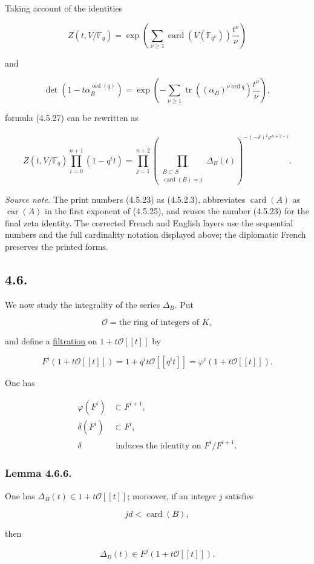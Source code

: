 Taking account of the identities

\begin{equation}\tag{4.5.31}
Z(t,V/\mathbb F_q)
=\exp\!\left(
\sum_{\nu\geq1}
\operatorname{card}(V(\mathbb F_{q^\nu}))\frac{t^\nu}{\nu}
\right)
\end{equation}

and

\begin{equation}\tag{4.5.32}
\det\!\left(1-t\alpha_B^{\operatorname{ord}(q)}\right)
=\exp\!\left(
-\sum_{\nu\geq1}
\operatorname{tr}\!\left((\alpha_B)^{\nu\operatorname{ord}q}\right)
\frac{t^\nu}{\nu}
\right),
\end{equation}

formula (4.5.27) can be rewritten as

\begin{equation}\tag{4.5.33}
Z(t,V/\mathbb F_q)\prod_{i=0}^{n+1}(1-q^it)
=\prod_{j=1}^{n+2}
\left(
\prod_{\substack{B\subset S\\\operatorname{card}(B)=j}}
\Delta_B(t)
\right)^{-(-\delta)^j\varphi^{n+2-j}}.
\end{equation}

\medskip
\noindent\emph{Source note.}
The print numbers (4.5.23) as (4.5.2.3), abbreviates
$\operatorname{card}(A)$ as $\operatorname{car}(A)$ in the first exponent
of (4.5.25), and reuses the number (4.5.23) for the final zeta identity.
The corrected French and English layers use the sequential numbers and the
full cardinality notation displayed above; the diplomatic French preserves
the printed forms.

\subsection*{4.6.}
We now study the integrality of the series $\Delta_B$. Put

\begin{equation}\tag{4.6.1}
\mathcal O=\text{the ring of integers of $K$},
\end{equation}

and define a \underline{filtration} on $1+t\mathcal O[[t]]$ by

\begin{equation}\tag{4.6.2}
F^i(1+t\mathcal O[[t]])
=1+q^it\mathcal O[[q^it]]
=\varphi^i(1+t\mathcal O[[t]]).
\end{equation}

One has

\begin{align}
\varphi(F^i)&\subset F^{i+1}, \tag{4.6.3}\\
\delta(F^i)&\subset F^i, \tag{4.6.4}\\
\delta&\text{ induces the identity on }F^i/F^{i+1}. \tag{4.6.5}
\end{align}

\subsubsection*{Lemma 4.6.6.}
One has $\Delta_B(t)\in1+t\mathcal O[[t]]$; moreover, if an integer $j$
satisfies

\begin{equation}\tag{4.6.7}
jd<\operatorname{card}(B),
\end{equation}

then

\begin{equation}\tag{4.6.8}
\Delta_B(t)\in F^j(1+t\mathcal O[[t]]).
\end{equation}

